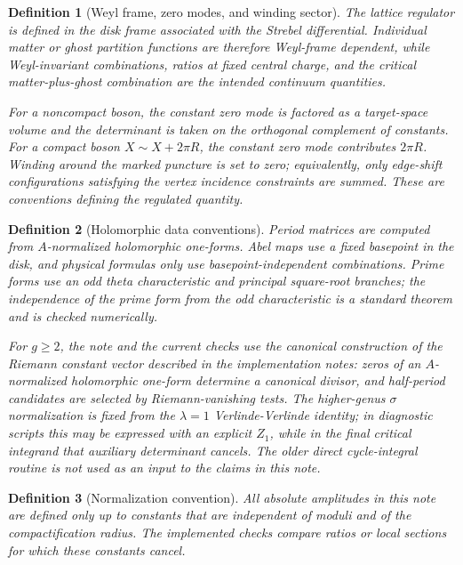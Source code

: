 \documentclass[11pt]{article}
\numberwithin{equation}{section}
\newtheorem{definition}{Definition}
\begin{document}
\begin{definition}[Weyl frame, zero modes, and winding sector]
The lattice regulator is defined in the disk frame associated with the Strebel
differential.  Individual matter or ghost partition functions are therefore
Weyl-frame dependent, while Weyl-invariant combinations, ratios at fixed
central charge, and the critical matter-plus-ghost combination are the intended
continuum quantities.

For a noncompact boson, the constant zero mode is factored as a target-space
volume and the determinant is taken on the orthogonal complement of constants.
For a compact boson \(X\sim X+2\pi R\), the constant zero mode contributes
\(2\pi R\).  Winding around the marked puncture is set to zero; equivalently,
only edge-shift configurations satisfying the vertex incidence constraints are
summed.  These are conventions defining the regulated quantity.
\end{definition}

\begin{definition}[Holomorphic data conventions]
Period matrices are computed from \(A\)-normalized holomorphic one-forms.  Abel
maps use a fixed basepoint in the disk, and physical formulas only use
basepoint-independent combinations.  Prime forms use an odd theta
characteristic and principal square-root branches; the independence of the
prime form from the odd characteristic is a standard theorem and is checked
numerically.

For \(g\geq2\), the note and the current checks use the canonical construction
of the Riemann constant vector described in the implementation notes: zeros of
an \(A\)-normalized holomorphic one-form determine a canonical divisor, and
half-period candidates are selected by Riemann-vanishing tests.  The
higher-genus \(\sigma\) normalization is fixed from the \(\lambda=1\)
Verlinde-Verlinde identity; in diagnostic scripts this may be expressed with an
explicit \(Z_1\), while in the final critical integrand that auxiliary
determinant cancels.
The older direct cycle-integral routine is not used as an input to the claims
in this note.
\end{definition}

\begin{definition}[Normalization convention]
All absolute amplitudes in this note are defined only up to constants that are
independent of moduli and of the compactification radius.  The implemented
checks compare ratios or local sections for which these constants cancel.
\end{definition}
\end{document}
